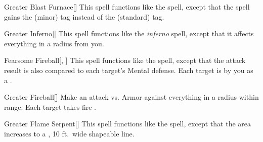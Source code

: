 \lowercase{\hypertarget{spell:Greater Blast Furnace}{}}\label{spell:Greater Blast Furnace}
\begin{freeability}[\nth{4}]{\hypertarget{spell:Greater Blast Furnace}{Greater Blast Furnace}}[]
This spell functions like the  spell, except that the spell gains the  (minor) tag instead of the  (standard) tag.
\end{freeability}
\vspace{0.25em}



\lowercase{\hypertarget{spell:Greater Inferno}{}}\label{spell:Greater Inferno}
\begin{freeability}[\nth{4}]{\hypertarget{spell:Greater Inferno}{Greater Inferno}}[]
This spell functions like the \textit{inferno} spell, except that it affects everything in a \arealarge radius from you.
\end{freeability}
\vspace{0.25em}



\lowercase{\hypertarget{spell:Fearsome Fireball}{}}\label{spell:Fearsome Fireball}
\begin{freeability}[\nth{5}]{\hypertarget{spell:Fearsome Fireball}{Fearsome Fireball}}[, ]
This spell functions like the  spell, except that the attack result is also compared to each target's Mental defense.
\hit Each target is  by you as a .
\end{freeability}
\vspace{0.25em}



\lowercase{\hypertarget{spell:Greater Fireball}{}}\label{spell:Greater Fireball}
\begin{freeability}[\nth{5}]{\hypertarget{spell:Greater Fireball}{Greater Fireball}}[]
Make an attack vs. Armor against everything in a \areamed radius within \rngmed range.
\hit Each target takes fire .
\end{freeability}
\vspace{0.25em}



\lowercase{\hypertarget{spell:Greater Flame Serpent}{}}\label{spell:Greater Flame Serpent}
\begin{freeability}[\nth{5}]{\hypertarget{spell:Greater Flame Serpent}{Greater Flame Serpent}}[]
This spell functions like the  spell, except that the area increases to a \arealarge, 10 ft.\ wide shapeable line.
\end{freeability}
\vspace{0.25em}



